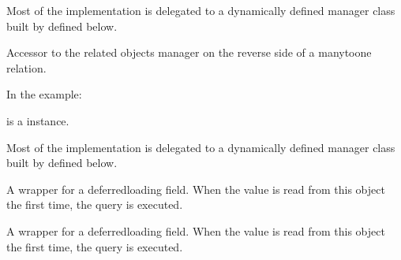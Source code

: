 \documentclass[letterpaper,10pt,spanish]{sphinxmanual}
\begin{document}
\begin{fulllineitems}
\begin{fulllineitems}
\sphinxAtStartPar
Most of the implementation is delegated to a dynamically defined manager
class built by  defined below.

\end{fulllineitems}



\begin{fulllineitems}

\pysigstartsignatures
{}
\pysigstopsignatures
\sphinxAtStartPar
Accessor to the related objects manager on the reverse side of a
many\sphinxhyphen{}to\sphinxhyphen{}one relation.

\sphinxAtStartPar
In the example:

\begin{sphinxVerbatim}[commandchars=\\\{\}]
 
       
\end{sphinxVerbatim}

\sphinxAtStartPar
{} is a  instance.

\sphinxAtStartPar
Most of the implementation is delegated to a dynamically defined manager
class built by  defined below.

\end{fulllineitems}



\begin{fulllineitems}

\pysigstartsignatures
{}
\pysigstopsignatures
\sphinxAtStartPar
A wrapper for a deferred\sphinxhyphen{}loading field. When the value is read from this
object the first time, the query is executed.

\end{fulllineitems}



\begin{fulllineitems}

\pysigstartsignatures
{}
\pysigstopsignatures
\sphinxAtStartPar
A wrapper for a deferred\sphinxhyphen{}loading field. When the value is read from this
object the first time, the query is executed.


\end{fulllineitems}
\end{fulllineitems}
\end{document}
